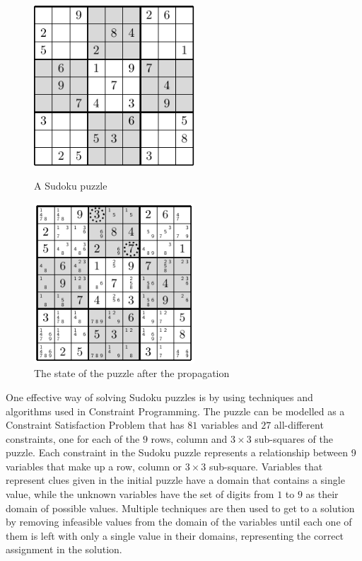 \documentclass{l4proj}
\begin{document}
\begin{figure}[H]
\begin{center}
\begin{minipage}{6cm}
\includegraphics[height=6cm]{sudokugrid.pdf}
\caption{A Sudoku puzzle}
\label{sudokugrid1}
\end{minipage}%
\hspace{2.5cm}
\begin{minipage}{6cm}
\includegraphics[trim=0.075cm 0.075cm 0.075cm 0.075cm, height=6cm]{sudokugrid2.pdf}
\caption{The state of the puzzle after the propagation}
\label{sudokugrid2}
\end{minipage}%
\end{center}
\end{figure}

\vspace{-1cm}

\noindent One effective way of solving Sudoku puzzles is by using techniques and algorithms used in Constraint Programming. The puzzle can be modelled as a Constraint Satisfaction Problem \cite{simonis2005sudoku} that has $81$ variables and $27$ all-different constraints, one for each of the $9$ rows, column and $3\times 3$ sub-squares of the puzzle. Each constraint in the Sudoku puzzle represents a relationship between 9 variables that make up a row, column or $3\times 3$ sub-square. Variables that represent clues given in the initial puzzle have a domain that contains a single value, while the unknown variables have the set of digits from $1$ to $9$ as their domain of possible values. Multiple techniques are then used to get to a solution by removing infeasible values from the domain of the variables until each one of them is left with only a single value in their domains, representing the correct assignment in the solution.
\end{document}

